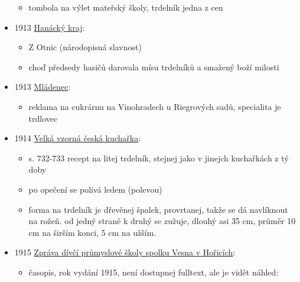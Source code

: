 \begin{itemize}
  \begin{itemize}
  \tightlist
  \item
    tombola na výlet mateřský školy, trdelník jedna z cen
  \end{itemize}
\item
  1913
  \href{https://www.digitalniknihovna.cz/vkol/uuid/uuid:2997b9af-6b24-4bda-b3cb-6dc7e7e97004}{Hanácký
  kraj}:

  \begin{itemize}
  \tightlist
  \item
    Z Otnic (národopisná slavnost)
  \item
    choď předsedy hasičů darovala mísu trdelníků a smažený boží milosti
  \end{itemize}
\item
  1913
  \href{https://ceskadigitalniknihovna.cz/view/uuid:6c6a5e90-917d-11e8-9588-5ef3fc9bb22f?page=uuid\%3A034ac5a0-9a3b-11e8-b814-5ef3fc9bb22f&fulltext=trdlovec&source=nkp}{Mládenec}:

  \begin{itemize}
  \tightlist
  \item
    reklama na cukrárnu na Vinohradech u Riegrových sadů, specialita je
    trdlovec
  \end{itemize}
\item
  1914
  \href{https://www.digitalniknihovna.cz/uzei/uuid/uuid:dcea1ada-9d5a-4be8-a92a-fdab1e9e93e0}{Velká
  vzorná česká kuchařka}:

  \begin{itemize}
  \tightlist
  \item
    s. 732-733 recept na litej trdelník, stejnej jako v jinejch
    kuchařkách z tý doby
  \item
    po opečení se polívá ledem (polevou)
  \item
    forma na trdelník je dřevěnej špalek, provrtanej, takže se dá
    navlíknout na rožeň. od jedný straně k druhý se zužuje, dlouhý asi
    35 cm, průměr 10 cm na širším konci, 5 cm na užším.
  \end{itemize}
\item
  1915
  \href{https://ceskadigitalniknihovna.cz/view/uuid:f679b550-74ec-11ef-b80e-5ef3fc9bb22f?page=uuid:091aa6cd-7fcc-4ef0-99cd-a2a5f9d72724&fulltext=trd*ln*k*&source=nkp}{Zpráva
  dívčí průmyslové školy spolku Vesna v Hořicích}:

  \begin{itemize}
  \tightlist
  \item
    časopis, rok vydání 1915, není dostupnej fulltext, ale je vidět
    náhled:


\end{itemize}
\end{itemize}

